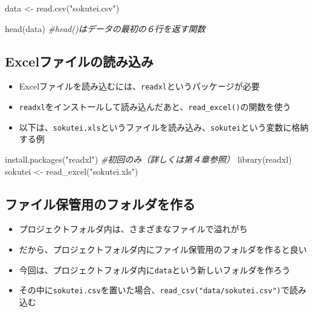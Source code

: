 \documentclass[
]{book}
\newenvironment{Shaded}{\begin{snugshade}}{\end{snugshade}}
\newcommand{\CommentTok}[1]{\textcolor[rgb]{0.56,0.35,0.01}{\textit{#1}}}
\newcommand{\FunctionTok}[1]{\textcolor[rgb]{0.00,0.00,0.00}{#1}}
\newcommand{\NormalTok}[1]{#1}
\newcommand{\OtherTok}[1]{\textcolor[rgb]{0.56,0.35,0.01}{#1}}
\newcommand{\StringTok}[1]{\textcolor[rgb]{0.31,0.60,0.02}{#1}}
\providecommand{\tightlist}{%
  \setlength{\itemsep}{0pt}\setlength{\parskip}{0pt}}
\begin{document}
\begin{Shaded}
\begin{Highlighting}[]
\NormalTok{data }\OtherTok{\textless{}{-}} \FunctionTok{read.csv}\NormalTok{(}\StringTok{"sokutei.csv"}\NormalTok{)}

\FunctionTok{head}\NormalTok{(data) }\CommentTok{\#head()はデータの最初の６行を返す関数}
\end{Highlighting}
\end{Shaded}

\hypertarget{excelux30d5ux30a1ux30a4ux30ebux306eux8aadux307fux8fbcux307f}{%
\subsection{Excelファイルの読み込み}\label{excelux30d5ux30a1ux30a4ux30ebux306eux8aadux307fux8fbcux307f}}

\begin{itemize}
\tightlist
\item
  Excelファイルを読み込むには、\texttt{readxl}というパッケージが必要
\item
  \texttt{readxl}をインストールして読み込んだあと、\texttt{read\_excel()}の関数を使う
\item
  以下は、\texttt{sokutei.xls}というファイルを読み込み、\texttt{sokutei}という変数に格納する例
\end{itemize}

\begin{Shaded}
\begin{Highlighting}[]
\FunctionTok{install.packages}\NormalTok{(}\StringTok{"readxl"}\NormalTok{) }\CommentTok{\#初回のみ（詳しくは第４章参照）}
\FunctionTok{library}\NormalTok{(readxl)}
\NormalTok{sokutei }\OtherTok{\textless{}{-}} \FunctionTok{read\_excel}\NormalTok{(}\StringTok{"sokutei.xls"}\NormalTok{)}
\end{Highlighting}
\end{Shaded}

\hypertarget{ux30d5ux30a1ux30a4ux30ebux4fddux7ba1ux7528ux306eux30d5ux30a9ux30ebux30c0ux3092ux4f5cux308b}{%
\subsection{ファイル保管用のフォルダを作る}\label{ux30d5ux30a1ux30a4ux30ebux4fddux7ba1ux7528ux306eux30d5ux30a9ux30ebux30c0ux3092ux4f5cux308b}}

\begin{itemize}
\tightlist
\item
  プロジェクトフォルダ内は、さまざまなファイルで溢れがち
\item
  だから、プロジェクトフォルダ内にファイル保管用のフォルダを作ると良い
\item
  今回は、プロジェクトフォルダ内に\texttt{data}という新しいフォルダを作ろう
\item
  その中に\texttt{sokutei.csv}を置いた場合、\texttt{read\_csv("data/sokutei.csv")}で読み込む
\end{itemize}
\end{document}
